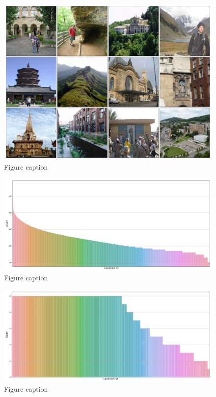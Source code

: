 \documentclass[final,3p]{elsarticle}
\begin{document}
\begin{figure}[hbtp]
\centering\includegraphics[width=1.0\linewidth]{./figures/sample.png}
\caption{Figure caption}
\label{fig:problem}
\end{figure}


\begin{figure}[hbtp]
\centering\includegraphics[width=1.0\linewidth]{./figures/all_distribution.png}
\caption{Figure caption}
\label{fig:problem}
\end{figure}


\begin{figure}[hbtp]
\centering\includegraphics[width=1.0\linewidth]{./figures/subset_distribution.png}
\caption{Figure caption}
\label{fig:problem}
\end{figure}
\end{document}
